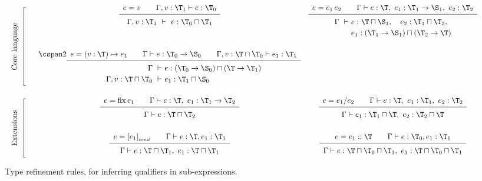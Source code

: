 \begin{figure*}
\vspace{-8mm}
\newcommand\typerule[2]{{\renewcommand\arraystretch{1.5}\begin{array}[t]{c} #1 \\ \hline #2 \end{array}}}
\[
\renewcommand\arraystretch{2.8}
\begin{array}{cccp{1cm}}
  \multirow{2}{1cm}[-2em]{\begin{tikzpicture}\draw (0,0) -- ++(-1mm,0) -- ++(0,-10.2em) {} node[midway,anchor=base,xshift=-3mm,rotate=90] {Core language} -- ++(1mm,0);\end{tikzpicture}} &
  \typerule{e=v \qquad \Gamma,v:\T_1\vdash e:\T_0}
           {\Gamma,v:\T_1 ~\vdash~ e:\T_0\sqcap\T_1} &
  \typerule{e=e_1\,e_2 \qquad \Gamma \vdash e:\T, ~ e_1:\T_1\to\S_1, ~ e_2:\T_2}
           {\renewcommand\arraystretch{1.2}
            \begin{array}[t]{@{}l@{}l@{}}
              \Gamma ~\vdash~ & e:\T\sqcap\S_1,  \quad
                                e_2:\T_1\sqcap\T_2, \\
                              & e_1:(\T_1\to\S_1)\sqcap(\T_2\to\T)
            \end{array}} & \\
  &
  \cspan2{
  \typerule{e=(v:\T)\mapsto e_1 \qquad \Gamma\vdash e:\T_0\to\S_0 \qquad \Gamma,v:\T\sqcap\T_0\vdash e_1:\T_1}
           {\renewcommand\arraystretch{1.2}
            \begin{array}[t]{r@{}l}
              \Gamma ~\vdash~ & e:(\T_0\to\S_0)\sqcap(\T\to\T_1)\\
              \Gamma,v:\T\sqcap\T_0 ~\vdash~ & e_1:\T_1\sqcap\S_0 
            \end{array}}  } & \\
  \multirow{2}{1cm}[-1.8em]{\begin{tikzpicture}\draw (0,0) -- ++(-1mm,0) -- ++(0,-7.7em) node[midway,anchor=base,xshift=-3mm,rotate=90] {Extensions} -- ++(1mm,0);\end{tikzpicture}} &
  \typerule{e=\fix e_1 \qquad \Gamma\vdash e:\T, ~ e_1:\T_1\to\T_2}          %
           {\Gamma\vdash e: \T\sqcap\T_2} &
  \typerule{e=e_1/e_2 \qquad \Gamma\vdash e:\T, ~ e_1:\T_1, ~ e_2:\T_2}      %
           {\renewcommand\arraystretch{1.2}
            \begin{array}[t]{@{}l@{}l@{}}
              \Gamma\vdash{} & e_1:\T_1\sqcap\T, ~ e_2:\T_2\sqcap\T
            \end{array}} & \\
  &
  \typerule{e=[e_1]_{_{cond}} \qquad \Gamma\vdash e:\T,e_1:\T_1}                           %
           {\Gamma\vdash e:\T\sqcap\T_1, ~ e_1:\T\sqcap\T_1} &
  \typerule{e=e_1::\T \qquad \Gamma\vdash e:\T_0,e_1:\T_1}                           %
           {\Gamma\vdash e:\T\sqcap\T_0\sqcap\T_1, ~ e_1:\T\sqcap\T_0\sqcap\T_1}
\end{array}
\]
\caption{\label{lang:type refinement rules}
  Type refinement rules, for inferring qualifiers in sub-expressions.}
  \vspace{2mm}
\end{figure*}

